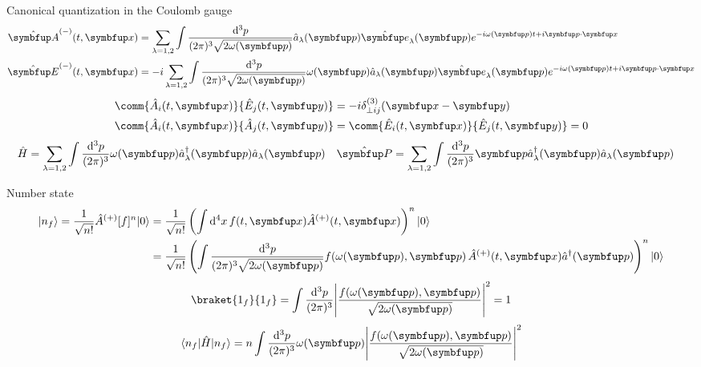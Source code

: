 \documentclass[aspectratio=169,usenames,dvipsnames]{beamer}
\begin{document}
	\begin{frame}{Canonical quantization in the Coulomb gauge}
		\begin{align}
			\vu{A}^{(-)}(t,\vb{x})
			&=
			\sum_{\lambda=1,2}
			\int\frac{\dd[3]{p}}{(2\pi)^3\sqrt{2\omega(\vb{p})}}
			\hat{a}_\lambda(\vb{p})
			\vu{e}_\lambda(\vb{p})
			e^{-i\omega(\vb{p})t+i\vb{p}\vdot\vb{x}}
			\\
			\vu{E}^{(-)}(t,\vb{x})
			&=
			-i
			\sum_{\lambda=1,2}
			\int\frac{\dd[3]{p}}{(2\pi)^3\sqrt{2\omega(\vb{p})}}
			\omega(\vb{p})
			\hat{a}_\lambda(\vb{p})
			\vu{e}_\lambda(\vb{p})
			e^{-i\omega(\vb{p})t+i\vb{p}\vdot\vb{x}}
		\end{align}
		\begin{align}
			\comm{\hat{A}_i(t,\vb{x})}{\hat{E}_j(t,\vb{y})}
			&=
			-i\delta_{\perp ij}^{(3)}(\vb{x}-\vb{y})
			\\
			\comm{\hat{A}_i(t,\vb{x})}{\hat{A}_j(t,\vb{y})}
			&=
			\comm{\hat{E}_i(t,\vb{x})}{\hat{E}_j(t,\vb{y})}
			=
			0
		\end{align}
		\begin{align}
			\hat{H}
			&=
			\sum_{\lambda=1,2}
			\int\frac{\dd[3]{p}}{(2\pi)^3}
			\omega(\vb{p})
			\hat{a}_\lambda^\dagger(\vb{p})
			\hat{a}_\lambda(\vb{p})
			&
			\vu{P}
			&=
			\sum_{\lambda=1,2}
			\int\frac{\dd[3]{p}}{(2\pi)^3}
			\vb{p}
			\hat{a}_\lambda^\dagger(\vb{p})
			\hat{a}_\lambda(\vb{p})
		\end{align}
	\end{frame}
	
	\begin{frame}{Number state}
		\begin{equation}
			\begin{split}
				\ket{n_f}
				=
				\frac{1}{\sqrt{n!}}
				\hat{A}^{(+)}[f]^n
				\ket{0}
				&=
				\frac{1}{\sqrt{n!}}
				\left(
					\int\dd[4]{x}
					f(t,\vb{x})
					\hat{A}^{(+)}(t,\vb{x})
				\right)^n
				\ket{0}
				\\
				&=
				\frac{1}{\sqrt{n!}}
				\left(
					\int\frac{\dd[3]{p}}{(2\pi)^3\sqrt{2\omega(\vb{p})}}
					f\!\left(\omega(\vb{p}),\vb{p}\right)
					\hat{A}^{(+)}(t,\vb{x})
					\hat{a}^\dagger(\vb{p})
				\right)^n
				\ket{0}
			\end{split}
		\end{equation}
		\begin{equation}
			\braket{1_f}{1_f}
			=
			\int\frac{\dd[3]{p}}{(2\pi)^3}
			\abs*{\frac{f\!\left(\omega(\vb{p}),\vb{p}\right)}{\sqrt{2\omega(\vb{p})}}}^2
			=
			1
		\end{equation}
		\begin{equation}
			\bra{n_f}
			\hat{H}
			\ket{n_f}
			=
			n
			\int\frac{\dd[3]{p}}{(2\pi)^3}
			\omega(\vb{p})
			\abs*{\frac{f\!\left(\omega(\vb{p}),\vb{p}\right)}{\sqrt{2\omega(\vb{p})}}}^2
		\end{equation}
	\end{frame}
\end{document}
